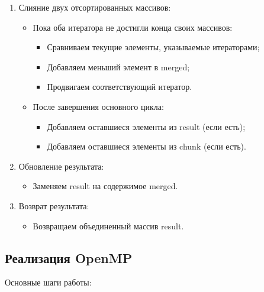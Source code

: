 \documentclass[]{article}
\theoremstyle{remark}
\theoremstyle{definition}
\newcommand{\cpp}{\textit{}}
\begin{document}
\begin{itemize}
\begin{enumerate}
        \item Слияние двух отсортированных массивов:
        \begin{itemize}
            \item Пока оба итератора не достигли конца своих массивов:
            \begin{itemize}
                \item Сравниваем текущие элементы, указываемые итераторами;
                \item Добавляем меньший элемент в \cpp{merged};
                \item Продвигаем соответствующий итератор.
            \end{itemize}
            \item После завершения основного цикла:
            \begin{itemize}
                \item Добавляем оставшиеся элементы из \cpp{result} (если есть);
                \item Добавляем оставшиеся элементы из \cpp{chunk} (если есть).
            \end{itemize}
        \end{itemize}

        \item Обновление результата:
        \begin{itemize}
            \item Заменяем \cpp{result} на содержимое \cpp{merged}.
        \end{itemize}

        \item Возврат результата:
        \begin{itemize}
            \item Возвращаем объединенный массив result.
        \end{itemize}
    \end{enumerate}
\end{itemize}

\subsection{Реализация OpenMP}

Основные шаги работы:
\end{document}

